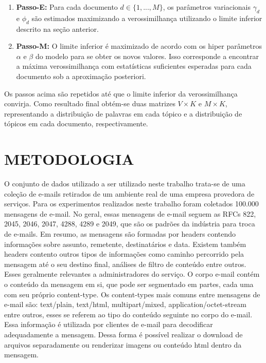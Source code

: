 \documentclass[12pt,a4paper]{article}
\begin{document}
\begin{enumerate}
\item \textbf{Passo-E:} Para cada documento $d \in \{1,. . . , M\}$, os parâmetros variacionais $\gamma_d$ e $\phi_d$ são estimados maximizando a verossimilhança utilizando o limite inferior descrito na seção anterior.
\item \textbf{Passo-M:} O limite inferior é maximizado  de acordo com os hiper parâmetros $\alpha$ e $\beta$ do modelo para se obter os novos valores. 
 Isso corresponde a encontrar a máxima verossimilhança com estatísticas suficientes esperadas para cada documento sob a aproximação posteriori.
\end{enumerate}

Os passos acima são repetidos até que o limite inferior da verossimilhança convirja. Como resultado final obtém-se duas matrizes $V \times K$ e $M \times K$,
 representando  a distribuição de palavras em cada tópico e a distribuição de tópicos em cada documento, respectivamente.



\section{METODOLOGIA}
O conjunto de dados utilizado a ser utilizado neste trabalho trata-se de uma coleção de e-mails retirados de um ambiente real de uma empresa provedora de serviços. 
 Para os experimentos realizados neste trabalho foram coletados 100.000 mensagens de e-mail. No geral, essas mensagens de e-mail seguem as RFCs 822, 2045, 2046, 2047, 4288, 4289 e 2049,
 que são os padrões da indústria para troca de e-mails.	Em resumo, as mensagens são formadas por headers contendo informações sobre assunto, remetente, destinatários e data.
 Existem também headers contento outros tipos de informações como caminho percorrido pela mensagem até o seu destino final, análises de filtro de conteúdo entre outros. Esses geralmente relevantes a administradores do serviço. O corpo e-mail contém o conteúdo da mensagem em si, que pode ser segmentado em  partes, cada uma com seu próprio content-type. 
 Os content-types mais comuns entre mensagens de e-mail são: text/plain, text/html, multipart/mixed, application/octet-stream entre outros, esses se referem ao tipo do conteúdo seguinte no corpo do e-mail.
 Essa informação é utilizada por clientes de e-mail para decodificar adequadamente a mensagem. Dessa forma é possível realizar o download de arquivos separadamente ou renderizar imagens ou conteúdo html dentro da mensagem.
\end{document}
